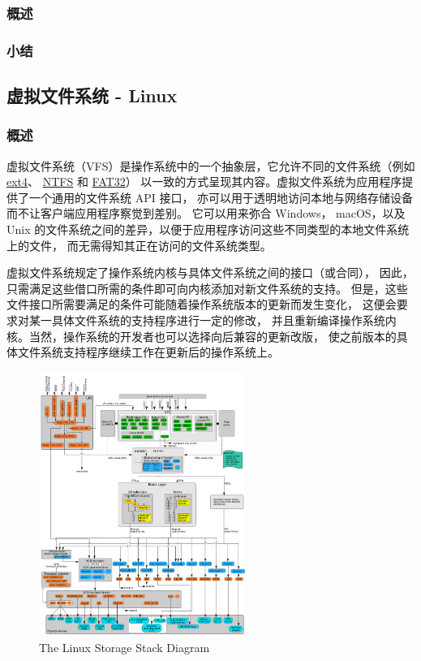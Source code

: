 \documentclass[UTF8,a4paper]{ctexart}
\begin{document}
\subsubsection{概述}
\subsubsection{小结}

\subsection{虚拟文件系统 - Linux}
\subsubsection{概述}

虚拟文件系统（VFS）是操作系统中的一个抽象层，它允许不同的文件系统（例如
\href{https://en.wikipedia.org/wiki/Ext4}{ext4}、
\href{https://en.wikipedia.org/wiki/NTFS}{NTFS}
和
\href{https://en.wikipedia.org/wiki/File_Allocation_Table}{FAT32}）
以一致的方式呈现其内容。虚拟文件系统为应用程序提供了一个通用的文件系统
API
接口，
亦可以用于透明地访问本地与网络存储设备而不让客户端应用程序察觉到差别。
它可以用来弥合
Windows， macOS，以及 Unix
的文件系统之间的差异，以便于应用程序访问这些不同类型的本地文件系统上的文件，
而无需得知其正在访问的文件系统类型。

虚拟文件系统规定了操作系统内核与具体文件系统之间的接口（或合同），
因此，只需满足这些借口所需的条件即可向内核添加对新文件系统的支持。
但是，这些文件接口所需要满足的条件可能随着操作系统版本的更新而发生变化，
这便会要求对某一具体文件系统的支持程序进行一定的修改，
并且重新编译操作系统内核。当然，操作系统的开发者也可以选择向后兼容的更新改版，
使之前版本的具体文件系统支持程序继续工作在更新后的操作系统上。

\begin{figure}[H]
    \centering
    \includegraphics[width=0.6\textwidth]{The_Linux_Storage_Stack_Diagram.png}
    \caption{The Linux Storage Stack Diagram}
\end{figure}
\end{document}
